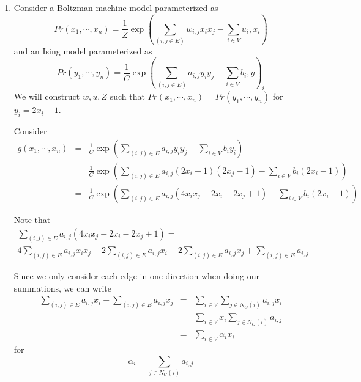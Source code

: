 \documentclass{article}
\begin{document}
\begin{enumerate}
	\item Consider a Boltzman machine model parameterized as
	\begin{equation}
		Pr(x_1,\cdots,x_n) = \frac{1}{Z}\exp(\sum_{(i,j\in E)}w_{i,j}x_ix_j - \sum_{i\in V}u_i, x_i)
	\end{equation}
	and an Ising model parameterized as 
	\begin{equation}
	Pr(y_1,\cdots,y_n) = \frac{1}{C}\exp(\sum_{(i,j\in E)}a_{i,j}y_iy_j - \sum_{i\in V}b_i, y)_i
	\end{equation}
	We will construct $w, u, Z$ such that
	$Pr(x_1,\cdots,x_n) = Pr(y_1,\cdots,y_n)$
	for $y_i = 2x_i - 1$.

	Consider
	\begin{equation}
		\begin{aligned}
			 g(x_1,\cdots,x_n) & = & \frac{1}{C} \exp(\sum_{(i,j)\in E}a_{i,j}y_iy_j - \sum_{i\in V}b_iy_i) \\
			 & = & \frac{1}{C}\exp(\sum_{(i, j)\in E}a_{i,j}(2x_i - 1)(2x_j - 1) - \sum_{i \in V}b_i(2x_i - 1)) \\
			 & = &\frac{1}{C}\exp(\sum_{(i, j)\in E}a_{i,j}(4x_ix_j - 2x_i - 2x_j + 1) - \sum_{i \in V}b_i(2x_i - 1))
		\end{aligned}
	\end{equation}

	Note that 
	\begin{equation}
		\begin{aligned}
		\sum_{(i, j)\in E}a_{i,j}(4x_ix_j - 2x_i - 2x_j + 1) = \\ 
		4\sum_{(i, j)\in E}a_{i,j}x_ix_j - 2\sum_{(i, j)\in E}a_{i,j}x_i - 2\sum_{(i, j)\in E}a_{i,j}x_j + \sum_{(i, j)\in E}a_{i,j}
		\end{aligned}
	\end{equation}

	Since we only consider each edge in one direction when doing our summations, we can write 
	\begin{equation}
		\begin{aligned}
		\sum_{(i, j)\in E}a_{i,j}x_i + \sum_{(i, j)\in E}a_{i,j}x_j  & = & \sum_{i \in V}\sum_{j \in N_G(i)} a_{i, j} x_i \\
		&  = & \sum_{i \in V} x_i \sum_{j \in N_G(i)} a_{i, j} \\ 
		& = & \sum_{i \in V} \alpha_i x_i
		\end{aligned}
	\end{equation}
	 for 
	\begin{equation}
		\alpha_i = \sum_{j \in N_G(i)} a_{i, j} 
	\end{equation} 


\end{enumerate}
\end{document}
